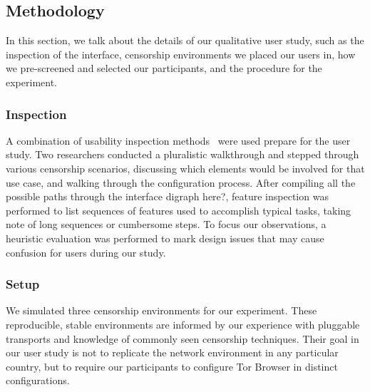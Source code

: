 \documentclass[USenglish,oneside,twocolumn]{article}
\begin{document}
\subsection{Methodology} 
In this section, we talk about the details of our qualitative user study, such as the inspection of the interface, censorship environments we placed our users in, how we pre-screened and selected our participants, and the procedure for the experiment. 

\subsubsection{Inspection} 
A combination of usability inspection methods~\cite{nielsen1994usability}
 were used prepare for the user study. Two researchers conducted a pluralistic 
walkthrough and stepped through various censorship
scenarios, discussing which elements would be involved for that use case, and walking 
through the configuration process. After compiling all the possible paths through the 
interface {\color {red} digraph here?}, feature inspection was performed to list sequences
of features used to accomplish typical tasks, taking note of long sequences or cumbersome
steps. To focus our observations, a heuristic evaluation was performed to mark design issues 
that may cause confusion for users during our study. 

\subsubsection{Setup}
\label{sec:setup}
We simulated three censorship environments for our experiment.
These reproducible, stable environments are informed by our experience 
with pluggable transports and knowledge of commonly seen censorship 
techniques. Their goal in our user study is not to replicate the network 
environment in any particular country, but to require our participants to 
configure Tor Browser in distinct configurations. \\
\end{document}
